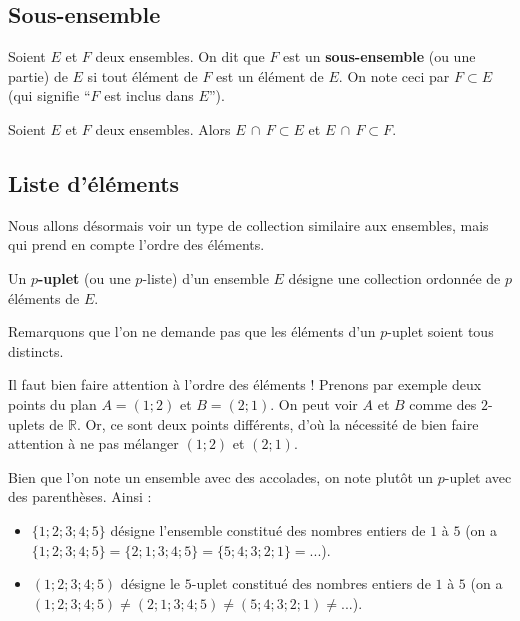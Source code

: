 	\subsection{Sous-ensemble}
	
	\begin{formula}[Définition]
		Soient $E$ et $F$ deux ensembles. On dit que $F$ est un \textbf{sous-ensemble} (ou une partie) de $E$ si tout élément de $F$ est un élément de $E$.
		\newpar
		On note ceci par $F \subset E$ (qui signifie ``$F$ est inclus dans $E$'').
	\end{formula}
	
	
	\begin{tip}[Exemple]
		Soient $E$ et $F$ deux ensembles. Alors $E \, \cap \, F \subset E$ et $E \, \cap \, F \subset F$.
	\end{tip}
	
	\subsection{Liste d'éléments}
	
	Nous allons désormais voir un type de collection similaire aux ensembles, mais qui prend en compte l'ordre des éléments.
	
	\begin{formula}[Définition]
		Un \textbf{$p$-uplet} (ou une $p$-liste) d'un ensemble $E$ désigne une collection ordonnée de $p$ éléments de $E$.
	\end{formula}
	
	Remarquons que l'on ne demande pas que les éléments d'un $p$-uplet soient tous distincts.
	
	\begin{tip}
		Il faut bien faire attention à l'ordre des éléments ! Prenons par exemple deux points du plan $A = (1; 2)$ et $B = (2; 1)$.
		\newpar
		On peut voir $A$ et $B$ comme des $2$-uplets de $\mathbb{R}$. Or, ce sont deux points différents, d'où la nécessité de bien faire attention à ne pas mélanger $(1; 2)$ et $(2; 1)$.
	\end{tip}
	
	\begin{tip}[Notation]
		Bien que l'on note un ensemble avec des accolades, on note plutôt un $p$-uplet avec des parenthèses. Ainsi :
		\begin{itemize}
			\item $\{1; 2; 3; 4; 5\}$ désigne l'ensemble constitué des nombres entiers de $1$ à $5$ (on a $\{1; 2; 3; 4; 5\} = \{2; 1; 3; 4; 5\} = \{5; 4; 3; 2; 1\} = ...$).
			\item $(1; 2; 3; 4; 5)$ désigne le $5$-uplet constitué des nombres entiers de $1$ à $5$ (on a $(1; 2; 3; 4; 5) \neq (2; 1; 3; 4; 5) \neq (5; 4; 3; 2; 1) \neq ...$).
		\end{itemize}
	\end{tip}
	
